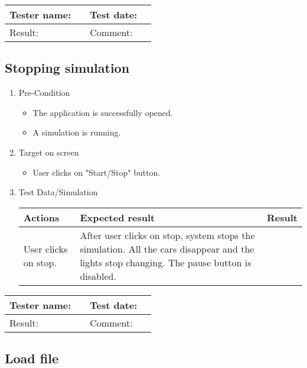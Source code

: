 \begin{tabularx}{\textwidth}{|p{3cm}X|p{3cm}X|}\hline
	Tester name: &  & Test date: & \\\hline
	Result: &  \pass & Comment: & \\\hline
\end{tabularx}

\subsection{Stopping  simulation}

\begin{enumerate}
	\item Pre-Condition
	\begin{itemize}
		\item The application is successfully opened.
		\item A simulation is running.
	\end{itemize}
	\item Target on screen
	\begin{itemize}
		\item User clicks on "Start/Stop" button.
	\end{itemize}
	\item Test Data/Simulation
	\begin{tabularx}{\textwidth}{|X|X|p{2.5cm}|}\hline
		Actions & Expected result & Result \\\hline
		User clicks on stop. & After user clicks on stop, system stops the simulation. All the cars disappear and the lights stop changing. The pause button is disabled. & \pass \\\hline    
	\end{tabularx}
\end{enumerate}

\begin{tabularx}{\textwidth}{|p{3cm}X|p{3cm}X|}\hline
	Tester name: &  & Test date: & \\\hline
	Result: &  \pass & Comment: & \\\hline
\end{tabularx}

\newpage

\subsection{Load file}

